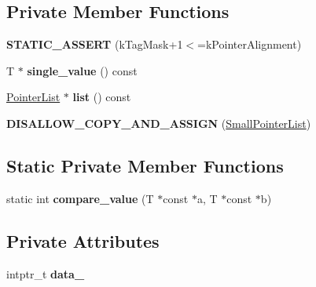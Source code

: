 \subsection*{Private Member Functions}
\begin{DoxyCompactItemize}
\item 
{\bfseries S\+T\+A\+T\+I\+C\+\_\+\+A\+S\+S\+E\+RT} (k\+Tag\+Mask+1$<$=k\+Pointer\+Alignment)\hypertarget{classv8_1_1internal_1_1_small_pointer_list_a1d1b5b1ea204466f9eb90c86330bc4ed}{}\label{classv8_1_1internal_1_1_small_pointer_list_a1d1b5b1ea204466f9eb90c86330bc4ed}

\item 
T $\ast$ {\bfseries single\+\_\+value} () const \hypertarget{classv8_1_1internal_1_1_small_pointer_list_aa09ea88dbb0546b04a2717c19f8cc9f8}{}\label{classv8_1_1internal_1_1_small_pointer_list_aa09ea88dbb0546b04a2717c19f8cc9f8}

\item 
\hyperlink{classv8_1_1internal_1_1_zone_list}{Pointer\+List} $\ast$ {\bfseries list} () const \hypertarget{classv8_1_1internal_1_1_small_pointer_list_aca46aa43aa5f8daa24c7c7a69756cc52}{}\label{classv8_1_1internal_1_1_small_pointer_list_aca46aa43aa5f8daa24c7c7a69756cc52}

\item 
{\bfseries D\+I\+S\+A\+L\+L\+O\+W\+\_\+\+C\+O\+P\+Y\+\_\+\+A\+N\+D\+\_\+\+A\+S\+S\+I\+GN} (\hyperlink{classv8_1_1internal_1_1_small_pointer_list}{Small\+Pointer\+List})\hypertarget{classv8_1_1internal_1_1_small_pointer_list_ab0c63a4234108021af67216f6958452b}{}\label{classv8_1_1internal_1_1_small_pointer_list_ab0c63a4234108021af67216f6958452b}

\end{DoxyCompactItemize}
\subsection*{Static Private Member Functions}
\begin{DoxyCompactItemize}
\item 
static int {\bfseries compare\+\_\+value} (T $\ast$const $\ast$a, T $\ast$const $\ast$b)\hypertarget{classv8_1_1internal_1_1_small_pointer_list_ae1a0276ebfca4c37ad4238ab267f299b}{}\label{classv8_1_1internal_1_1_small_pointer_list_ae1a0276ebfca4c37ad4238ab267f299b}

\end{DoxyCompactItemize}
\subsection*{Private Attributes}
\begin{DoxyCompactItemize}
\item 
intptr\+\_\+t {\bfseries data\+\_\+}\hypertarget{classv8_1_1internal_1_1_small_pointer_list_a49d2f2c9d3f4deea5bd0227ad5d6e4b4}{}\label{classv8_1_1internal_1_1_small_pointer_list_a49d2f2c9d3f4deea5bd0227ad5d6e4b4}

\end{DoxyCompactItemize}
